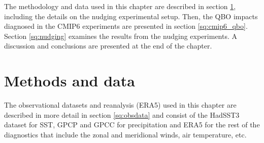The methodology and data used in this chapter are described in section \ref{sq:qbo_methoddata}, including the details on the nudging experimental setup. Then, the QBO impacts diagnosed in the CMIP6 experiments are presented in section \ref{sq:cmip6_qbo}. Section \ref{sq:nudging} examines the results from the nudging experiments. 
A discussion and conclusions are presented at the end of the chapter. %





\section{Methods and data} \label{sq:qbo_methoddata}

The observational datasets and reanalysis (ERA5) used in this chapter are described in more detail in section \ref{sq:obsdata} and consist of the HadSST3 dataset for SST, GPCP and GPCC for precipitation and ERA5 for the rest of the diagnostics that include the zonal and meridional winds, air temperature, etc.

